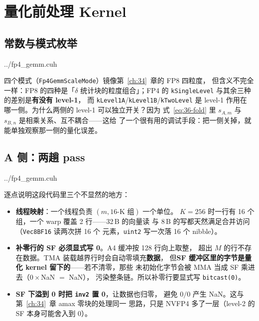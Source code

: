 \section{量化前处理 Kernel}

\subsection{常数与模式枚举}

\begin{lstinputlisting}[linerange={61-93},firstnumber=auto,
  title={fp4\_gemm.cuh L61-93（量化常数、scale 模式、向量化 IO 单元）}]{../fp4_gemm.cuh}
\end{lstinputlisting}

四个模式（\texttt{Fp4GemmScaleMode}）镜像第~\ref{ch:34}~章的 FP8 四粒度，
但含义不完全一样：FP8 的四种是「$\delta$ 统计块的粒度组合」；FP4 的
\texttt{kSingleLevel} 与其余三种的差别是\textbf{有没有 level-1}，
而 \texttt{kLevel1A}/\texttt{kLevel1B}/\texttt{kTwoLevel} 是 level-1 作用在
哪一侧。为什么两侧的 level-1 可以独立开关？因为
式~\ref{eq:36-fold} 里 $s_{A,m}$ 与 $s_{B,n}$ 是相乘关系、互不耦合——这给
了一个很有用的调试手段：把一侧关掉，就能单独观察那一侧的量化误差。

\subsection{A 侧：两趟 pass}

\begin{lstinputlisting}[linerange={153-233},firstnumber=auto,
  title={fp4\_gemm.cuh L153-233（行 amax pass + A 侧量化 kernel）}]{../fp4_gemm.cuh}
\end{lstinputlisting}

逐点说明这段代码里三个不显然的地方：

\begin{itemize}[itemsep=2pt,topsep=3pt]
  \item \textbf{线程映射}：一个线程负责 $(m, \text{16-K 组})$ 一个单位。
        $K{=}256$ 时一行有 16 个组，一个 warp 覆盖 2 行——32\,B 的向量读
        与 8\,B 的写都天然满足合并访问（\texttt{Vec8BF16} 读两次拼 16 个
        元素，\texttt{uint2} 写一次落 16 个 nibble）。
  \item \textbf{补零行的 SF 必须显式写 0}。A4 缓冲按 128 行向上取整，
        超出 $M$ 的行不存在数据。TMA 装载越界行时会自动零填充\textbf{数据}，
        但\textbf{SF 缓冲区里的字节是量化 kernel 留下的}——若不清零，那些
        未初始化字节会被 MMA 当成 SF 乘进去（$0\times$NaN $=$ NaN），
        污染整条链。所以补零行要显式写 \texttt{bitcast(0)}。
  \item \textbf{SF 下溢到 0 时把 \texttt{inv2} 置 0}，让数据也归零，
        避免 $0/0$ 产生 NaN。这与第~\ref{ch:34}~章 amax 零块的处理同一
        思路，只是 NVFP4 多了一层（level-2 的 SF 本身可能舍入到 0）。
\end{itemize}

